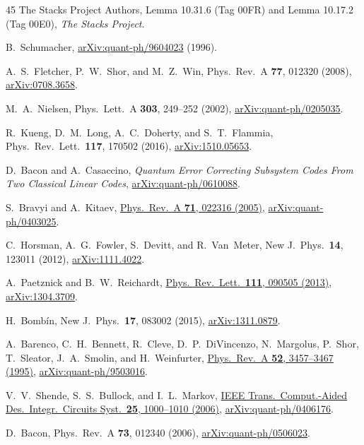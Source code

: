 \documentclass[aps,prl,reprint,notitlepage,nofootinbib,nobibnotes]{revtex4-2}
\begin{document}
\begin{thebibliography}{45}
The Stacks Project Authors,
Lemma 10.31.6 (Tag 00FR) and Lemma 10.17.2 (Tag 00E0),
\emph{The Stacks Project}.

B.~Schumacher,
\href{https://arxiv.org/abs/quant-ph/9604023}{arXiv:quant-ph/9604023} (1996).

A.~S.~Fletcher, P.~W.~Shor, and M.~Z.~Win,
Phys.\ Rev.\ A \textbf{77}, 012320 (2008),
\href{https://arxiv.org/abs/0708.3658}{arXiv:0708.3658}.

M.~A.~Nielsen,
Phys.\ Lett.\ A \textbf{303}, 249--252 (2002),
\href{https://arxiv.org/abs/quant-ph/0205035}{arXiv:quant-ph/0205035}.

R.~Kueng, D.~M.~Long, A.~C.~Doherty, and S.~T.~Flammia,
Phys.\ Rev.\ Lett.\ \textbf{117}, 170502 (2016),
\href{https://arxiv.org/abs/1510.05653}{arXiv:1510.05653}.

D.~Bacon and A.~Casaccino,
\emph{Quantum Error Correcting Subsystem Codes From Two Classical Linear Codes},
\href{https://arxiv.org/abs/quant-ph/0610088}{arXiv:quant-ph/0610088}.

S.~Bravyi and A.~Kitaev,
\href{https://link.aps.org/doi/10.1103/PhysRevA.71.022316}{Phys.\ Rev.\ A \textbf{71}, 022316
(2005)},
\href{https://arxiv.org/abs/quant-ph/0403025}{arXiv:quant-ph/0403025}.

C.~Horsman, A.~G.~Fowler, S.~Devitt, and R.~Van~Meter,
New J.\ Phys.\ \textbf{14}, 123011 (2012),
\href{https://arxiv.org/abs/1111.4022}{arXiv:1111.4022}.

A.~Paetznick and B.~W.~Reichardt,
\href{https://link.aps.org/doi/10.1103/PhysRevLett.111.090505}{Phys.\ Rev.\ Lett.\ \textbf{111},
090505 (2013)},
\href{https://arxiv.org/abs/1304.3709}{arXiv:1304.3709}.

H.~Bomb\'in,
New J.\ Phys.\ \textbf{17}, 083002 (2015),
\href{https://arxiv.org/abs/1311.0879}{arXiv:1311.0879}.

A.~Barenco, C.~H.~Bennett, R.~Cleve, D.~P.~DiVincenzo,
N.~Margolus, P.~Shor, T.~Sleator, J.~A.~Smolin, and H.~Weinfurter,
\href{https://doi.org/10.1103/PhysRevA.52.3457}{Phys.\ Rev.\ A \textbf{52}, 3457--3467 (1995)},
\href{https://arxiv.org/abs/quant-ph/9503016}{arXiv:quant-ph/9503016}.

V.~V.~Shende, S.~S.~Bullock, and I.~L.~Markov,
\href{https://doi.org/10.1109/TCAD.2005.855930}{IEEE Trans.\ Comput.-Aided Des.\ Integr.\ Circuits
Syst.\ \textbf{25}, 1000--1010 (2006)},
\href{https://arxiv.org/abs/quant-ph/0406176}{arXiv:quant-ph/0406176}.

D.~Bacon,
Phys.\ Rev.\ A \textbf{73}, 012340 (2006),
\href{https://arxiv.org/abs/quant-ph/0506023}{arXiv:quant-ph/0506023}.

\end{thebibliography}
\end{document}
